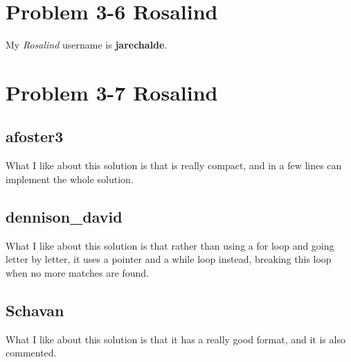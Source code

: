 \documentclass{article}
\begin{document}
\section*{Problem 3-6 Rosalind}

My \textit{Rosalind} username is \textbf{jarechalde}.

\section*{Problem 3-7 Rosalind}

\subsection*{afoster3}

What I like about this solution is that is really compact, and in a few lines can implement the whole solution.

\subsection*{dennison\_david}

What I like about this solution is that rather than using a for loop and going letter by letter, it uses a pointer and a while loop instead, breaking this loop when no more matches are found.

\subsection*{Schavan}

What I like about this solution is that it has a really good format, and it is also commented.
\end{document}

